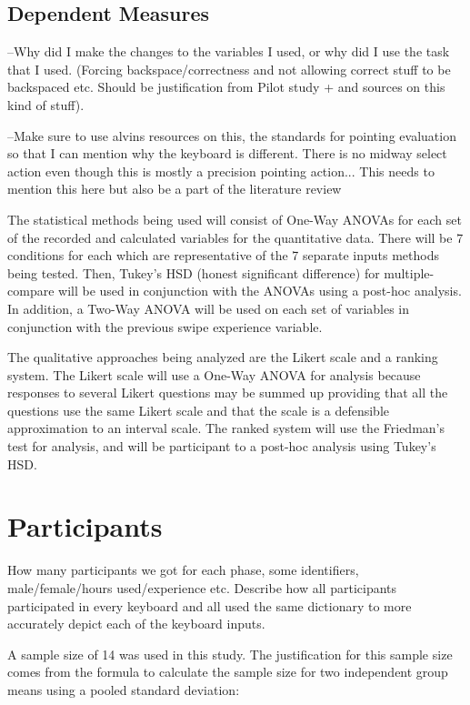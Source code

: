\subsection{Dependent Measures}

--Why did I make the changes to the variables I used, or why did I use the task that I used. (Forcing backspace/correctness and not allowing correct stuff to be backspaced etc. Should be justification from Pilot study + and sources on this kind of stuff).

--Make sure to use alvins resources on this, the standards for pointing evaluation so that I can mention why the keyboard is different. There is no midway select action even though this is mostly a precision pointing action... This needs to mention this here but also be a part of the literature review

The statistical methods being used will consist of One-Way ANOVAs for each set of the recorded and calculated variables for the quantitative data. There will be 7 conditions for each which are representative of the 7 separate inputs methods being tested. Then, Tukey's HSD (honest significant difference) for multiple-compare will be used in conjunction with the ANOVAs using a post-hoc analysis. In addition, a Two-Way ANOVA will be used on each set of variables in conjunction with the previous swipe experience variable.

The qualitative approaches being analyzed are the Likert scale and a ranking system. The Likert scale will use a One-Way ANOVA for analysis because responses to several Likert questions may be summed up providing that all the questions use the same Likert scale and that the scale is a defensible approximation to an interval scale. The ranked system will use the Friedman's test for analysis, and will be participant to a post-hoc analysis using Tukey's HSD.







\section{Participants}

How many participants we got for each phase, some identifiers, male/female/hours used/experience etc. Describe how all participants participated in every keyboard and all used the same dictionary to more accurately depict each of the keyboard inputs.

A sample size of 14 was used in this study. The justification for this sample size comes from the formula to calculate the sample size for two independent group means using a pooled standard deviation:

